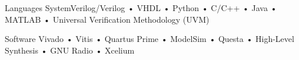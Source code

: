 


\begin{cvskills}


\cvskill
{Languages} %
{SystemVerilog/Verilog • VHDL • Python • C/C++ • Java • MATLAB • Universal Verification Methodology (UVM)} %


\cvskill
{Software} %
{Vivado • Vitis • Quartus Prime • ModelSim • Questa • High-Level Synthesis • GNU Radio • Xcelium} %



\end{cvskills}